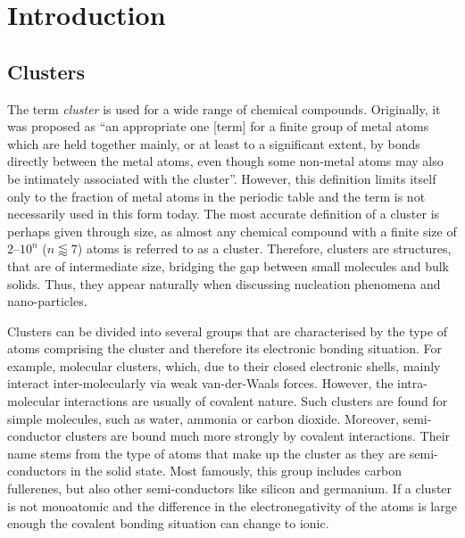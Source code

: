 
\part{Introduction}
\label{sec:introduction}

%
\chapter{Clusters}
\label{sec:clusters}

The term \emph{cluster} is used for a wide range of chemical compounds.
Originally, it was proposed as ``an appropriate one [term] for a finite group of
metal atoms which are held together mainly, or at least to a significant extent,
by bonds directly between the metal atoms, even though some non-metal atoms may
also be intimately associated with the
cluster''.\autocite{Cotton_MetalAtomClusters_1964} However, this definition
limits itself only to the fraction of metal atoms in the periodic table and the
term is not necessarily used in this form today. The most accurate definition of
a cluster is perhaps given through size, as almost any chemical compound with a
finite size of $2$--$10^n$ ($n\lessapprox 7$) atoms is referred to as a
cluster.\autocite{Johnston_Atomicmolecularclusters_2002,Wales_Energylandscapes_2003}
Therefore, clusters are structures, that are of intermediate size, bridging the
gap between small molecules and bulk solids. Thus, they appear naturally when
discussing nucleation phenomena and nano-particles.

Clusters can be divided into several groups that are characterised by the type
of atoms comprising the cluster and therefore its electronic bonding situation.
For example, molecular clusters, which, due to their closed electronic shells,
mainly interact inter-molecularly via weak van-der-Waals forces. However, the
intra-molecular interactions are usually of covalent nature. Such clusters are
found for simple molecules, such as water,\autocite{Liu_WaterClusters_1996}
ammonia\autocite{Beu_Structureammoniaclusters_2001} or carbon
dioxide.\autocite{Takeuchi_GeometryOptimizationCarbon_2008} Moreover,
semi-conductor clusters are bound much more strongly by covalent interactions.
Their name stems from the type of atoms that make up the cluster as they are
semi-conductors in the solid state. Most famously, this group includes carbon
fullerenes\autocite{Kroto_stabilityfullerenesCn_1987}, but also other
semi-conductors like silicon\autocite{Zhu_Structuresstabilitiessmall_2003a} and
germanium.\autocite{Pacchioni_Silicongermaniumclusters_1986} If a cluster is not
monoatomic and the difference in the electronegativity of the atoms is large
enough the covalent bonding situation can change to ionic.

